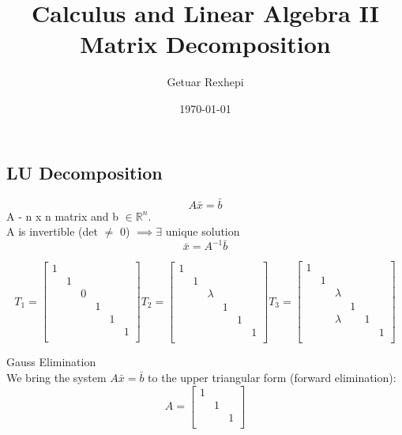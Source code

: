 \documentclass{article}
\title{Calculus and Linear Algebra II \\ Matrix Decomposition}
\author{Getuar Rexhepi}
\date\today
\begin{document}
\maketitle %


\subsection*{LU Decomposition}
$$ A\bar{x} = \bar{b} $$ 
A - n x n matrix and b $\in \mathbb{R}^n$. \\ A is invertible (det $\neq$ 0) $ \implies \exists$ unique solution $$\bar{x}=A^{-1}\bar{b}$$

$$T_1 = \begin{bmatrix}
1 & & & & &  \\
   & 1 & & & & \\
   &  & 0 & & &  \\
   &  & & 1& &  \\
   &  & & & 1 &  \\
   & & & & & 1 \\
\end{bmatrix}
T_2 = 
\begin{bmatrix}
1 & & & & &  \\
   & 1 & & & & \\
   &  & \lambda & & &  \\
   &  & & 1& &  \\
   &  & & & 1 &  \\
   & & & & & 1 \\
\end{bmatrix}
T_3 = 
\begin{bmatrix}
1 & & & & &  \\
   & 1 & & & & \\
   &  & \lambda & & &  \\
   &  & & 1& &  \\
   &  & \lambda& & 1 &  \\
   & & & & & 1 \\
\end{bmatrix}
$$

Gauss Elimination\\
We bring the system $ A\bar{x} = \bar{b} $ to the upper triangular form (forward elimination):
$$A =  \begin{bmatrix}
1 & &   \\
 & 1 &  \\
 &  & 1  \\
\end{bmatrix}
$$
\end{document}
